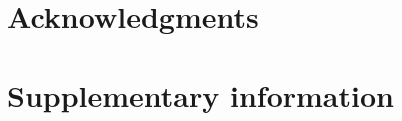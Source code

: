 \documentclass[aps,prl,amsmath,amssymb,groupedaddress,10pt,superscriptaddress,floatfix,twocolumn,showkeys,longbibliography]{revtex4-1} %
\begin{document}
\section{Acknowledgments}

%

\newpage

\appendix

\section{Supplementary information}
\label{supplementary}

\newpage
\end{document}
